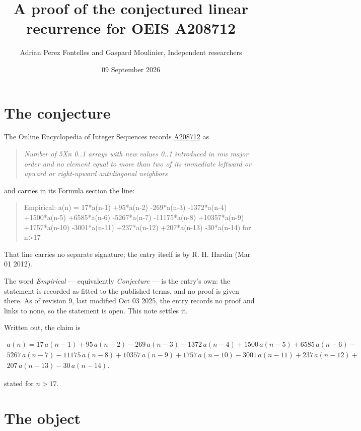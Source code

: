 \documentclass[11pt]{article}
\title{A proof of the conjectured linear recurrence for OEIS A208712}
\author{Adrian Perez Fontelles and Gaspard Moulinier, Independent researchers}
\date{09 September 2026}
\theoremstyle{definition}
\begin{document}
\maketitle
\section{The conjecture}

The Online Encyclopedia of Integer Sequences records \href{https://oeis.org/A208712}{A208712} as

\begin{quote}\itshape Number of 5Xn 0..1 arrays with new values 0..1 introduced in row major order and no element equal to more than two of its immediate leftward or upward or right-upward antidiagonal neighbors\end{quote}

and carries in its Formula section the line:

\begin{quote}\ttfamily Empirical: a(n) = 17*a(n-1) +95*a(n-2) -269*a(n-3) -1372*a(n-4) +1500*a(n-5) +6585*a(n-6) -5267*a(n-7) -11175*a(n-8) +10357*a(n-9) +1757*a(n-10) -3001*a(n-11) +237*a(n-12) +207*a(n-13) -30*a(n-14) for n>17\end{quote}

That line carries no separate signature; the entry itself is by R. H. Hardin (Mar 01 2012).

The word {\itshape Empirical} --- equivalently {\itshape Conjecture} --- is the entry's own: the statement is recorded as fitted to the published terms, and no proof is given there. As of revision 9, last modified Oct 03 2025, the entry records no proof and links to none, so the statement is open. This note settles it.

Written out, the claim is

\begin{multline*} a(n) = 17\,a(n-1) + 95\,a(n-2) - 269\,a(n-3) - 1372\,a(n-4) + 1500\,a(n-5) + 6585\,a(n-6) - \\ 5267\,a(n-7) - 11175\,a(n-8) + 10357\,a(n-9) + 1757\,a(n-10) - 3001\,a(n-11) + 237\,a(n-12) + \\ 207\,a(n-13) - 30\,a(n-14). \end{multline*}

stated for $n > 17$.

\section{The object}
\end{document}
